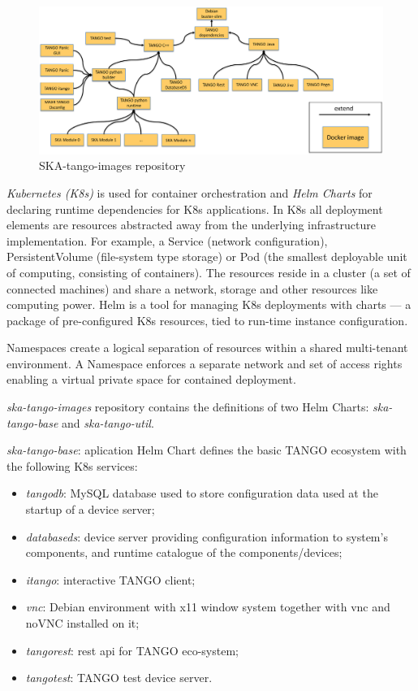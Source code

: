 \documentclass[a4paper,
	       keeplastbox,   %
	       References
	       ]{jacow}
\begin{document}
\begin{figure}[!htb]
   \centering
   \includegraphics*[width=0.8\columnwidth]{ska-tango-images}
   \caption{SKA-tango-images repository}
   \label{fig:ska-tango-images}
\end{figure}

\textit{Kubernetes (K8s)}\cite{kubernetes} is used for container orchestration and \textit{Helm Charts}\cite{helm} for declaring runtime dependencies for K8s applications. In K8s all deployment elements are resources abstracted away from the underlying infrastructure implementation. For example, a Service (network configuration), PersistentVolume (file-system type storage) or Pod (the smallest deployable unit of computing, consisting of containers). The resources reside in a cluster (a set of connected machines) and share a network, storage and other resources like computing power. Helm is a tool for managing K8s deployments with charts — a package of pre-configured K8s resources, tied to run-time instance configuration.  

Namespaces create a logical separation of resources within a shared multi-tenant environment. A Namespace enforces a separate network and set of access rights enabling a virtual private space for contained deployment.

\textit{ska-tango-images} repository contains the definitions of two Helm Charts: \textit{ska-tango-base} and \textit{ska-tango-util}.

\textit{ska-tango-base}: aplication Helm Chart defines the basic TANGO ecosystem with the following K8s services:

\begin{itemize}
	\setlength\itemsep{0.1em}
    \item \textit{tangodb}: MySQL database used to store configuration data used at the startup of a device server;
    \item \textit{databaseds}: device server providing configuration information to system's components, and runtime catalogue of the components/devices;
    \item \textit{itango}: interactive TANGO client;
    \item \textit{vnc}: Debian environment with x11 window system together with vnc\cite{vnc} and noVNC\cite{novnc} installed on it;
    \item \textit{tangorest}: rest api\cite{restapi} for TANGO eco-system;
    \item \textit{tangotest}: TANGO test device server\cite{tangotest}.
\end{itemize}
\end{document}
